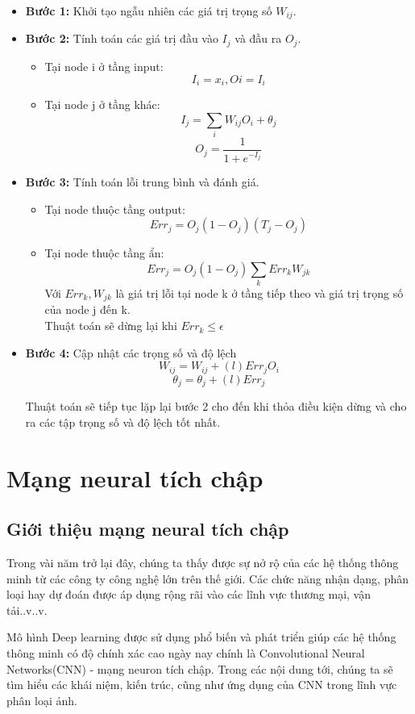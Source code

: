 		\begin{itemize}
			\item \textbf{Bước 1:} Khởi tạo ngẫu nhiên các giá trị trọng số  \(W_{ij}\).
			\item \textbf{Bước 2:} Tính toán các giá trị đầu vào \(I_{j}\) và đầu ra \(O_{j}\).
			\begin{itemize}
				\item Tại node i ở tầng input:
				\[I_{i} = x_{i}, O{i} = I_{i}\]
				\item Tại node j ở tầng khác:
				\[ I_{j} = \sum_{i} W_{ij}O_{i} + \theta_{j} \]
				\[O_{j} = \frac{1}{1 + e^{-I_{j}}}\]
			\end{itemize}
			\item \textbf{Bước 3:} Tính toán lỗi trung bình và đánh giá.
				\begin{itemize}
					\item Tại node thuộc tầng output:
					\[Err_{j} = O_{j}(1-O_{j})(T_{j} - O_{j})\]
					\item Tại node thuộc tầng ẩn:
					\[Err_{j} = O_{j}(1-O_{j})\sum_{k}Err_{k}W_{jk}\]
					Với \(Err_{k}, W_{jk}\) là giá trị lỗi tại node k ở tầng tiếp theo và giá trị trọng số của node j đến k.\\
					Thuật toán sẽ dừng lại khi \(Err_{k} \leq \epsilon\)
					
				\end{itemize}
			\item \textbf{Bước 4:} Cập nhật các trọng số và độ lệch
			\[W_{ij} = W_{ij} + (l)Err_{j}O_{i}\]
			\[\theta_{j} = \theta_{j} + (l)Err_{j}\]
			
			Thuật toán sẽ tiếp tục lặp lại bước 2 cho đến khi thỏa điều kiện dừng và cho ra các tập trọng số và độ lệch tốt nhất.
		\end{itemize}
	
			
			

\section{Mạng neural tích chập}

\subsection{Giới thiệu mạng neural tích chập}
	Trong vài năm trở lại đây, chúng ta thấy được sự nở rộ của các hệ thống thông minh từ các công ty công nghệ lớn trên thế giới. Các chức năng nhận dạng, phân loại hay dự đoán được áp dụng rộng rãi vào các lĩnh vực thương mại, vận tải..v..v.\par
	Mô hình Deep learning được sử dụng phổ biến và phát triển giúp các hệ thống thông minh có độ chính xác cao ngày nay chính là Convolutional Neural Networks(CNN) - mạng neuron tích chập. Trong các nội dung tới, chúng ta sẽ tìm hiểu các khái niệm, kiến trúc, cũng như ứng dụng của CNN trong lĩnh vực phân loại ảnh.

